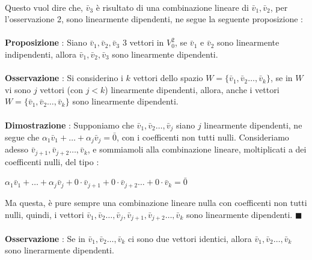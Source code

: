 \documentclass[12pt, letterpaper]{article}
\newcommand{\ve}{{\bar v}}
\newcommand{\acc}{\\\hphantom{}\\}
\begin{document}
\\Questo vuol dire che, \(\bar v_3\) è risultato di una combinazione lineare di  \(\bar v_1,\bar v_2 \), 
per l'osservazione 2, sono linearmente dipendenti, ne segue la seguente proposizione :
 \acc\textbf{Proposizione }: Siano \(\bar v_1,\bar v_2,\bar v_3\) 3 vettori in \(V_0^2\), se \(\bar v_1\) e \(\bar v_2\)
sono linearmente indipendenti, allora \(\bar v_1,\bar v_2,\bar v_3\) sono linearmente dipendenti.\acc 
\textbf{Osservazione }: Si considerino i \(k\) vettori dello spazio   \(W=\{\bar v_1,\bar v_2\dots,\bar v_k\}\),
 se in \(W\) vi sono \(j\) vettori (con \(j<k\)) linearmente dipendenti, allora, anche i vettori 
 \(W=\{\bar v_1,\bar v_2\dots,\bar v_k\}\) sono linearmente dipendenti.\acc
 \textbf{Dimostrazione} : Supponiamo che \(\bar v_1,\bar v_2\dots,\bar v_j\) siano \(j\) 
 linearmente dipendenti, ne segue che \(\alpha_1\bar v_1+\dots+\alpha_j\bar v_j=\bar 0\), con i coefficenti 
 non tutti nulli. Consideriamo adesso \(\bar v_{j+1},\bar v_{j+2}\dots,\bar v_{k}\), e sommiamoli alla combinazione 
 lineare, moltiplicati a dei coefficenti nulli, del tipo : \begin{center}
    \(\alpha_1\bar v_1+\dots+\alpha_j\bar v_j+0\cdot\bar v_{j+1}+0\cdot\bar v_{j+2}\dots+0\cdot\bar v_{k}=\bar 0\)
 \end{center}
 Ma questa, è pure sempre una combinazione lineare nulla con coefficenti non tutti nulli, quindi, 
 i vettori \(\bar v_1,\bar v_2\dots,\bar v_j,\bar v_{j+1},\bar v_{j+2}\dots,\bar v_k\) sono linearmente 
 dipendenti. \(\blacksquare\)\acc 
 \textbf{Osservazione }: Se in \(\ve_1,\ve_2\dots,\ve_k\) ci sono due vettori identici, allora 
 \(\ve_1,\ve_2\dots,\ve_k\) sono linerarmente dipendenti.
\end{document}
